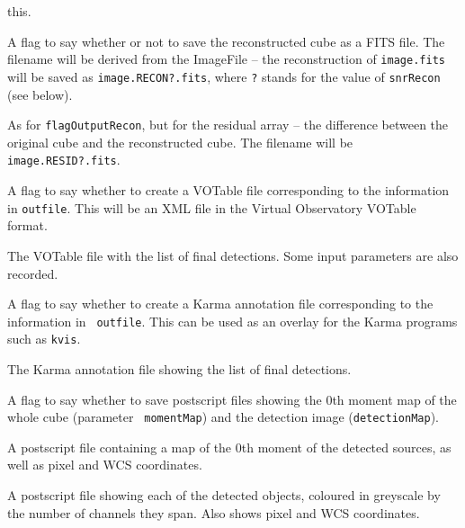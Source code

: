 \documentclass[12pt,a4paper]{article}
\newcommand{\entrylabel}[1]{\mbox{\textsf{\bf{#1:}}}\hfil}
\newenvironment{entry}
        {\begin{list}{}%
                {\renewcommand{\makelabel}{\entrylabel}%
                        \setlength{\labelwidth}{30mm}%
                        \setlength{\labelsep}{5pt}%
                        \setlength{\itemsep}{2pt}%
                        \setlength{\parsep}{2pt}%
                        \setlength{\leftmargin}{35mm}%
                }%
        }%
{\end{list}}
\begin{document}
\begin{entry}
  this.
\item[flagOutputRecon {\tt [false]}] A flag to say whether or not to
  save the reconstructed cube as a FITS file. The filename will be
  derived from the ImageFile -- the reconstruction of {\tt image.fits}
  will be saved as {\tt image.RECON?.fits}, where {\tt ?} stands for
  the value of {\tt snrRecon} (see below).
\item[flagOutputResid {\tt [false]}] As for {\tt flagOutputRecon}, but
  for the residual array -- the difference between the original cube
  and the reconstructed cube. The filename will be {\tt
  image.RESID?.fits}.
\item[flagVOT {\tt [false]}] A flag to say whether to create a VOTable
  file corresponding to the information in {\tt outfile}. This will be
  an XML file in the Virtual Observatory VOTable format.
\item[votFile {\tt [duchamp-Results.xml]}] The VOTable file with the
  list of final detections. Some input parameters are also recorded.
\item[flagKarma {\tt [false]}] A flag to say whether to create a Karma
  annotation file corresponding to the information in {\tt
  outfile}. This can be used as an overlay for the Karma programs such
  as {\tt kvis}.
\item[karmaFile {\tt [duchamp-Results.ann]}] The Karma annotation
  file showing the list of final detections. 
\item[flagMaps {\tt [true]}] A flag to say whether to save postscript
  files showing the 0th moment map of the whole cube (parameter {\tt
  momentMap}) and the detection image ({\tt detectionMap}).
\item[momentMap {\tt [duchamp-MomentMap.ps]}] A postscript file
  containing a map of the 0th moment of the detected sources, as well
  as pixel and WCS coordinates.
\item[detectionMap {\tt [duchamp-DetectionMap.ps]}] A postscript
  file showing each of the detected objects, coloured in greyscale by
  the number of channels they span. Also shows pixel and WCS
  coordinates.
\end{entry}
\end{document}
